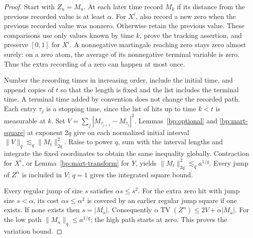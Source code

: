 \documentclass[11pt,letterpaper]{article}
\theoremstyle{definition}
\newcommand{\norm}[1]{\lVert#1\rVert}
\providecommand{\uses}[1]{}
\begin{document}
\begin{proof}
\uses{bp:optional,bp:mart-square,bp:mart-transform}
Start with \(Z_u=M_u\). At each later time record \(M_k\) if its
distance from the previous recorded value is at least \(\alpha\).
For \(X^i\), also record a new zero when the previous recorded value
was nonzero. Otherwise retain the previous value. These comparisons
use only values known by time \(k\), prove the tracking assertion,
and preserve \([0,1]\) for \(X^i\). A nonnegative martingale reaching
zero stays zero almost surely: on a zero atom, the average of its
nonnegative terminal variable is zero. Thus the extra recording of a
zero can happen at most once.

Number the recording times in increasing order, include the initial
time, and append copies of \(t\) so that the length is fixed and the
list includes the terminal time. A terminal time added by convention
does not change the recorded path. Each entry \(\tau_j\) is a
stopping time, since the list of hits up to time \(k<t\) is
measurable at \(k\). Set \(V=\sum_j |M_{\tau_{j+1}}-M_{\tau_j}|^2\).
Lemmas~\ref{bp:optional} and \ref{bp:mart-square} at exponent \(2q\)
give on each normalized initial interval
\(\norm{V}_q\lesssim_q\norm{M_t}_{2q}^2\). Raise to power \(q\),
sum with the interval lengths and integrate the fixed coordinates to
obtain the same inequality globally. Contraction for \(X^i\), or
Lemma~\ref{bp:mart-transform} for \(Y\), yields
\(\norm{M_t}_{2q}^{2}\lesssim_q a^{1/q}\).
Every jump of \(Z^\alpha\) is included in \(V\); \(q=1\)
gives the integrated square bound.

Every regular jump of size \(s\) satisfies \(\alpha s\le s^2\).
For the extra zero hit with jump size \(s<\alpha\), its cost
\(\alpha s\le\alpha^2\) is covered by an earlier regular jump
square if one exists. If none exists then \(s=|M_u|\). Consequently
\(\alpha\operatorname{TV}(Z^\alpha)\le2V+\alpha|M_u|\).
For the low path \(\norm{M_u}_q\le a^{1/q}\); the high path starts
at zero. This proves the variation bound.
\end{proof}
\end{document}

